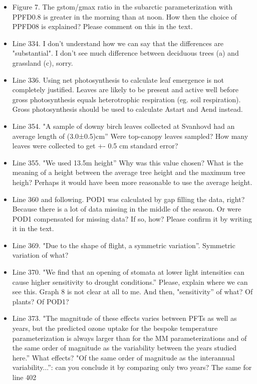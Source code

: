 \documentclass{scrartcl}
\begin{document}
\begin{itemize}
\item {\color{blue}Figure 7. The gstom/gmax ratio in the subarctic parameterization with PPFD0.8 is greater in the morning than at noon. How then the choice of PPFD08 is explained? Please comment on this in the text.}
\item {\color{blue}Line 334. I don't understand how we can say that the differences are "substantial". I don't see much difference between deciduous trees (a) and grassland (c), sorry.}

\item {\color{blue}Line 336. Using net photosynthesis to calculate leaf emergence is not completely justified. Leaves are likely to be present and active well before gross photosynthesis equals heterotrophic respiration (eg. soil respiration). Gross photosynthesis should be used to calculate Astart and Aend instead.}

\item {\color{blue}Line 354. "A sample of downy birch leaves collected at Svanhovd had an average length of (3.0±0.5)cm” Were top-canopy leaves sampled? How many leaves were collected to get +- 0.5 cm standard error?}

\item {\color{blue}Line 355. "We used 13.5m height”
Why was this value chosen? What is the meaning of a height between the average tree
height and the maximum tree heigh? Perhaps it would have been more reasonable to use
the average height.}

\item {\color{blue}Line 360 and following. POD1 was calculated by gap filling the data, right? Because there is a lot of data missing in the middle of the season. Or were POD1 compensated for missing data? If so, how? Please confirm it by writing it in the text.}

\item {\color{blue}Line 369. "Due to the shape of flight, a symmetric variation”.
Symmetric variation of what?}

\item {\color{blue}Line 370. "We find that an opening of stomata at lower light intensities can cause higher sensitivity to drought conditions.” Please, explain where we can see this. Graph 8 is not clear at all to me. And then, "sensitivity” of what? Of plants? Of POD1?}

\item {\color{blue}Line 373. "The magnitude of these effects varies between PFTs as well as years, but the predicted ozone uptake for the bespoke temperature parameterization is always larger than for the MM parameterizations and of the same order of magnitude as the variability between the years studied here.”
What effects? "Of the same order of magnitude as the interannual variability...”: can you conclude it by comparing only two years? The same for line 402}


\end{itemize}
\end{document}
